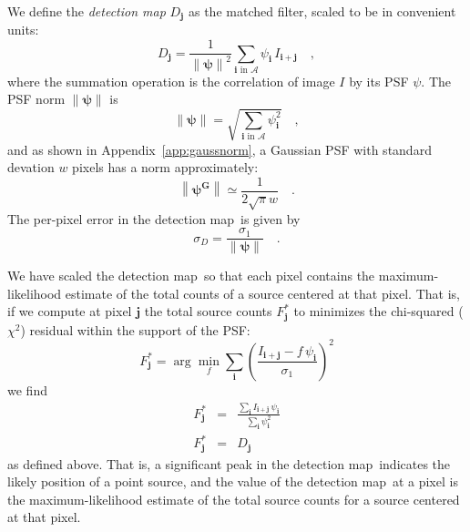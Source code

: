 \documentclass[letterpaper,preprint]{aastex62}
\newcommand{\appref}[1]{\mbox{Appendix~\ref{#1}}}
\newcommand{\detmap}{detection map}
\newcommand{\psf}{\psi}
\newcommand{\psfat}[1]{\psf_{#1}}
\newcommand{\psfnorm}{\norm{\bm{\psf}}}
\newcommand{\norm}[1]{\left\lVert #1 \right\rVert}
\newcommand{\psfw}{w}
\renewcommand{\vec}[1]{\boldsymbol{#1}}
\newcommand{\ivec}{\vec{i}}
\newcommand{\jvec}{\vec{j}}
\newcommand{\iina}{\ivec \,\, \mathrm{in} \,\, \mathcal{A}}
\begin{document}

We define the \emph{\detmap} $D_{\jvec}$ as the matched filter, scaled to be in convenient units:
\begin{equation}
D_{\jvec} = \frac{1}{\psfnorm^2} \sum_{\iina} \psfat{\ivec} \,
I_{\ivec + \jvec} \quad ,
\label{eq:detmap}
\end{equation}
where the summation operation is the correlation of image $I$ by its
PSF $\psf$.
The PSF norm $\psfnorm$ is
\begin{equation}
\psfnorm = \sqrt{\sum_{\iina} \psfat{\ivec}^2} \quad ,
\end{equation}
and as shown in \appref{app:gaussnorm}, a Gaussian PSF with standard
devation $\psfw$ pixels has a norm approximately:
\begin{equation}
  \norm{\bm{\psf^G}} \simeq \frac{1}{2 \sqrt{\pi} \psfw} \quad .
\end{equation}
The per-pixel error in the \detmap\ is given by
\begin{equation}
\sigma_{D} = \frac{\sigma_1}{\psfnorm} \quad .
\end{equation}


We have scaled the \detmap\ so that each pixel contains the
maximum-likelihood estimate of the total counts of a source centered
at that pixel.  That is, if we compute at pixel $\jvec$ the total
source counts $F^{\ast}_{\jvec}$ to minimizes the chi-squared
($\chi^2$) residual within the support of the PSF:
\begin{equation}
  F^{\ast}_{\jvec} = \arg\min_{f} \sum_{\ivec} \left( \frac{I_{\ivec+\jvec} - f \, \psfat{\ivec}}{\sigma_1} \right)^2
\end{equation}
we find
\begin{eqnarray}
  F^{\ast}_{\jvec} &=& \frac{\sum_{\ivec} I_{\ivec+\jvec} \, \psfat{\ivec}}{\sum_{\ivec} \psfat{\ivec}^2}
  \\
  F^{\ast}_{\jvec} &=& D_{\jvec} %
\end{eqnarray}
as defined above.
%
That is, a significant peak in the \detmap\ indicates the likely
position of a point source, and the value of the \detmap\ at a pixel
is the maximum-likelihood estimate of the total source counts for a
source centered at that pixel.
\end{document}
